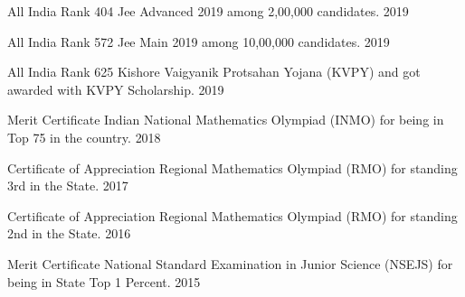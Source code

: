 

\begin{cvhonors}

    \cvhonor
      {All India Rank 404} %
      {Jee Advanced 2019 among 2,00,000 candidates.} %
      {}
      {2019} %

    \cvhonor
      {All India Rank 572} %
      {Jee Main 2019 among 10,00,000 candidates.} %
      {}
      {2019} %

    \cvhonor
      {All India Rank 625} %
      {Kishore Vaigyanik Protsahan Yojana (KVPY) and got awarded with KVPY Scholarship.} %
      {}
      {2019} %

    \cvhonor
      {Merit Certificate} %
      {Indian National Mathematics Olympiad (INMO) for being in Top 75 in the country.} %
      {}
      {2018} %
      
    \cvhonor
      {Certificate of Appreciation} %
      {Regional Mathematics Olympiad (RMO) for standing 3rd in the State.} %
      {}
      {2017} %

    \cvhonor
      {Certificate of Appreciation} %
      {Regional Mathematics Olympiad (RMO) for standing 2nd in the State.} %
      {}
      {2016} %

    \cvhonor
      {Merit Certificate} %
      {National Standard Examination in Junior Science (NSEJS) for being in State Top 1 Percent.} %
      {} 
      {2015} %
    

\end{cvhonors}